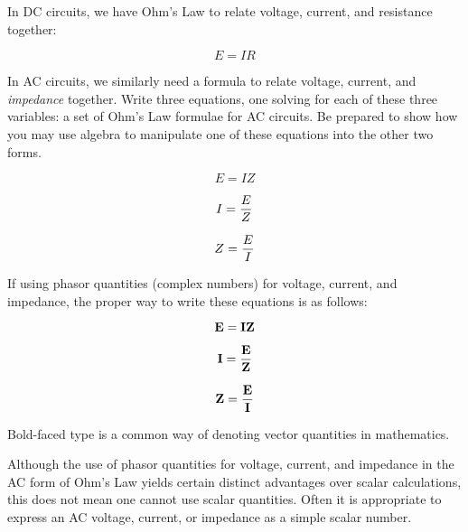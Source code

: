 

In DC circuits, we have Ohm's Law to relate voltage, current, and resistance together:

$$E = I R$$

In AC circuits, we similarly need a formula to relate voltage, current, and {\it impedance} together.  Write three equations, one solving for each of these three variables: a set of Ohm's Law formulae for AC circuits.  Be prepared to show how you may use algebra to manipulate one of these equations into the other two forms.







$$E = I Z$$

$$I = {E \over Z}$$

$$Z = {E \over I}$$

\vskip 10pt

If using phasor quantities (complex numbers) for voltage, current, and impedance, the proper way to write these equations is as follows:

$${\bf E} = {\bf IZ}$$

$${\bf I} = {{\bf E} \over {\bf Z}}$$

$${\bf Z} = {{\bf E} \over {\bf I}}$$

\vskip 10pt

Bold-faced type is a common way of denoting vector quantities in mathematics.







Although the use of phasor quantities for voltage, current, and impedance in the AC form of Ohm's Law yields certain distinct advantages over scalar calculations, this does not mean one cannot use scalar quantities.  Often it is appropriate to express an AC voltage, current, or impedance as a simple scalar number.




